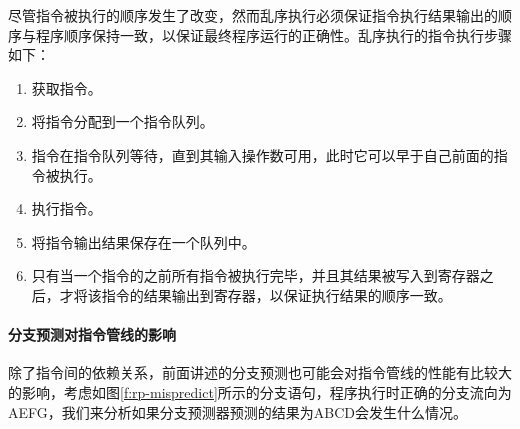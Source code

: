 尽管指令被执行的顺序发生了改变，然而乱序执行必须保证指令执行结果输出的顺序与程序顺序保持一致，以保证最终程序运行的正确性。乱序执行的指令执行步骤如下：

\begin{enumerate}
	\item 获取指令。
	\item 将指令分配到一个指令队列。
	\item 指令在指令队列等待，直到其输入操作数可用，此时它可以早于自己前面的指令被执行。  
	\item 执行指令。
	\item 将指令输出结果保存在一个队列中。 
	\item 只有当一个指令的之前所有指令被执行完毕，并且其结果被写入到寄存器之后，才将该指令的结果输出到寄存器，以保证执行结果的顺序一致。
\end{enumerate}




\paragraph{分支预测对指令管线的影响}
除了指令间的依赖关系，前面讲述的分支预测也可能会对指令管线的性能有比较大的影响，考虑如图\ref{f:rp-mispredict}所示的分支语句，程序执行时正确的分支流向为AEFG，我们来分析如果分支预测器预测的结果为ABCD会发生什么情况。


